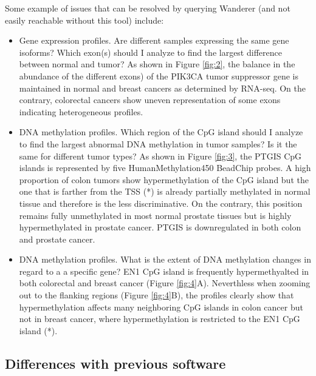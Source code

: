 \documentclass{bmcart}
\begin{document}

Some example of issues that can be resolved by querying Wanderer (and not easily reachable without this tool) include:

\begin{itemize}
\item Gene expression profiles. Are different samples expressing the same gene isoforms? Which exon(s) should I analyze to find the largest difference between normal and tumor? As shown in Figure \ref{fig:2}, the balance in the abundance of the different exons) of the PIK3CA tumor suppressor gene is maintained in normal and breast cancers as determined by RNA-seq. On the contrary, colorectal cancers show uneven representation of some exons indicating heterogeneous profiles.
\item DNA methylation profiles. Which region of the CpG island should I analyze to find the largest abnormal DNA methylation in tumor samples? Is it the same for different tumor types? As shown in Figure \ref{fig:3}, the PTGIS CpG islands is represented by five HumanMethylation450 BeadChip probes. A high proportion of colon tumors show hypermethylation of the CpG island but the one that is farther from the TSS (*) is already partially methylated in normal tissue and therefore is the less discriminative. On the contrary, this position remains fully unmethylated in most normal prostate tissues but is highly hypermethylated in prostate cancer. PTGIS is downregulated in both colon and prostate cancer.
\item DNA methylation profiles. What is the extent of DNA methylation changes in regard to a a specific gene? EN1 CpG island is frequently hypermethyalted in both colorectal and breast cancer (Figure \ref{fig:4}A). Neverthless when zooming out to the flanking regions (Figure \ref{fig:4}B), the profiles clearly show that hypermethylation affects many neighboring CpG islands in colon cancer but not in breast cancer, where hypermethylation is restricted to the EN1 CpG island (*).

\end{itemize}
\subsection*{Differences with previous software}
\end{document}
